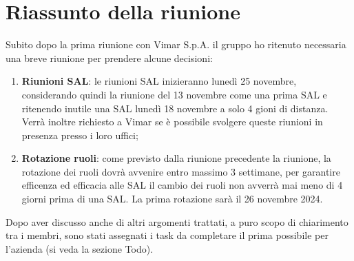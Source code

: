 \section{Riassunto della riunione}
Subito dopo la prima riunione con Vimar S.p.A. il gruppo ho ritenuto necessaria una breve riunione per prendere alcune decisioni:

\begin{enumerate}
    \item \textbf{Riunioni SAL}: le riunioni SAL inizieranno lunedì 25 novembre, considerando quindi la riunione del 13 novembre come una prima SAL e ritenendo inutile una SAL lunedì 18 novembre a solo 4 gioni di distanza. Verrà inoltre richiesto a Vimar se è possibile svolgere queste riunioni in presenza presso i loro uffici;

    \item \textbf{Rotazione ruoli}: come previsto dalla riunione precedente la riunione, la rotazione dei ruoli dovrà avvenire entro massimo 3 settimane, per garantire efficenza ed efficacia alle SAL il cambio dei ruoli non avverrà mai meno di 4 giorni prima di una SAL. La prima rotazione sarà il 26 novembre 2024.

\end{enumerate}

Dopo aver discusso anche di altri argomenti trattati, a puro scopo di chiarimento tra i membri, sono stati assegnati i task da completare il prima possibile per l'azienda (si veda la sezione Todo).
